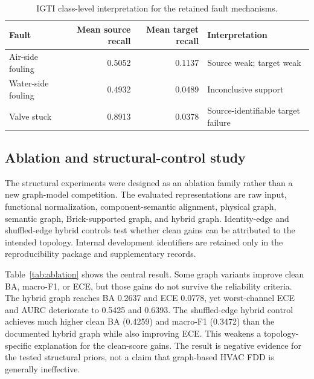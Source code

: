 \documentclass[preprint,12pt]{elsarticle}
\begin{document}
\begin{table}[H]
\centering
\caption{IGTI class-level interpretation for the retained fault mechanisms.}
\label{tab:igti}
\small
\begin{tabularx}{\textwidth}{lrrX}
\toprule
Fault & Mean source recall & Mean target recall & Interpretation\\
\midrule
Air-side fouling   & 0.5052 & 0.1137 & Source weak; target weak\\
Water-side fouling & 0.4932 & 0.0489 & Inconclusive support\\
Valve stuck        & 0.8913 & 0.0378 & Source-identifiable target failure\\
\bottomrule
\end{tabularx}
\end{table}

\subsection{Ablation and structural-control study}
The structural experiments were designed as an ablation family rather than a new graph-model competition. The evaluated representations are raw input, functional normalization, component-semantic alignment, physical graph, semantic graph, Brick-supported graph, and hybrid graph. Identity-edge and shuffled-edge hybrid controls test whether clean gains can be attributed to the intended topology. Internal development identifiers are retained only in the reproducibility package and supplementary records.

Table~\ref{tab:ablation} shows the central result. Some graph variants improve clean BA, macro-F1, or ECE, but those gains do not survive the reliability criteria. The hybrid graph reaches BA 0.2637 and ECE 0.0778, yet worst-channel ECE and AURC deteriorate to 0.5425 and 0.6393. The shuffled-edge hybrid control achieves much higher clean BA (0.4259) and macro-F1 (0.3472) than the documented hybrid graph while also improving ECE. This weakens a topology-specific explanation for the clean-score gains. The result is negative evidence for the tested structural priors, not a claim that graph-based HVAC FDD is generally ineffective.
\end{document}
